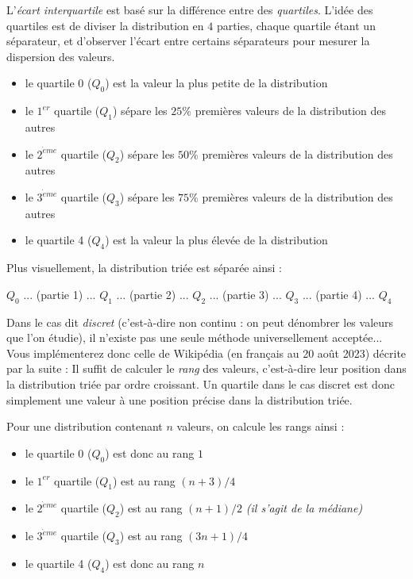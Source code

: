 \noindent L'\textit{écart interquartile} est basé sur la différence entre des \textit{quartiles}.
L'idée des quartiles est de diviser la distribution en $ 4 $ parties, chaque quartile étant un séparateur, et d'observer l'écart entre certains séparateurs pour mesurer la dispersion des valeurs.

\bigskip

\begin{itemize}
\item le quartile 0 ($Q_{0}$) est la valeur la plus petite de la distribution
\item le $ 1^{er} $ quartile ($Q_{1}$) sépare les $ 25\% $ premières valeurs de la distribution des autres
\item le $ 2^{\grave{e}me} $ quartile ($Q_{2}$) sépare les $ 50\% $ premières valeurs de la distribution des autres
\item le $ 3^{\grave{e}me} $ quartile ($Q_{3}$) sépare les $ 75\% $ premières valeurs de la distribution des autres
\item le quartile 4 ($Q_{4}$) est la valeur la plus élevée de la distribution
\end{itemize}

\bigskip

\noindent Plus visuellement, la distribution triée est séparée ainsi :

\begin{center}
$ Q_{0} $ ... (partie 1) ... $ Q_{1} $ ... (partie 2) ... $ Q_{2} $ ... (partie 3) ... $ Q_{3} $ ... (partie 4) ... $ Q_{4} $
\end{center}

\bigskip

\noindent Dans le cas dit \textit{discret} (c'est-à-dire non continu : on peut dénombrer les valeurs que l'on étudie), il n'existe pas une seule méthode universellement acceptée...
Vous implémenterez donc celle de Wikipédia (en français au 20 août 2023) décrite par la suite :
Il suffit de calculer le \textit{rang} des valeurs, c'est-à-dire leur position dans la distribution triée par ordre croissant.
Un quartile dans le cas discret est donc simplement une valeur à une position précise dans la distribution triée.

\bigskip

\noindent Pour une distribution contenant $ n $ valeurs, on calcule les rangs ainsi :

\begin{itemize}
\item le quartile 0 ($Q_{0}$) est donc au rang $ 1 $
\item le $ 1^{er} $ quartile ($Q_{1}$) est au rang $ (n + 3) / 4 $
\item le $ 2^{\grave{e}me} $ quartile ($Q_{2}$) est au rang $ (n + 1) / 2 $ \textit{(il s'agit de la médiane)}
\item le $ 3^{\grave{e}me} $ quartile ($Q_{3}$) est au rang $ (3n + 1) / 4 $
\item le quartile 4 ($Q_{4}$) est donc au rang $ n $
\end{itemize}

